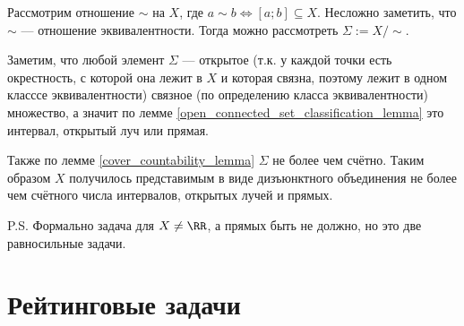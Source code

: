 \documentclass[12pt,a4paper]{article}
\begin{document}
\begin{enumproblem}[\textcolor{green}{сдано}]
        Рассмотрим отношение $\sim$ на $X$, где $a\sim b \Leftrightarrow [a;b] \subseteq X$. Несложно заметить, что $\sim$ --- отношение эквивалентности. Тогда можно рассмотреть $\Sigma := X/\sim$.
        
        Заметим, что любой элемент $\Sigma$ --- открытое (т.к. у каждой точки есть окрестность, с которой она лежит в $X$ и которая связна, поэтому лежит в одном класссе эквивалентности) связное (по определению класса эквивалентности) множество, а значит по лемме \ref{open_connected_set_classification_lemma} это интервал, открытый луч или прямая.

        Также по лемме \ref{cover_countability_lemma} $\Sigma$ не более чем счётно. Таким образом $X$ получилось представимым в виде дизъюнктного объединения не более чем счётного числа интервалов, открытых лучей и прямых.

        P.S. Формально задача для $X \neq \RR$, а прямых быть не должно, но это две равносильные задачи.
    \end{enumproblem}

    \section*{Рейтинговые задачи}
\end{document}
